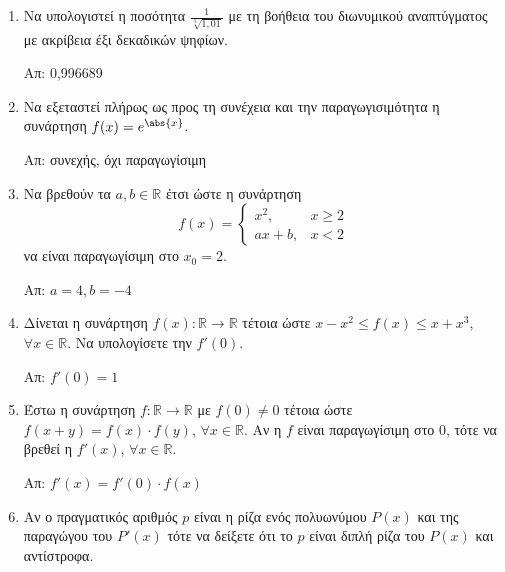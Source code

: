 






\begin{center}
\end{center}

\vspace{\baselineskip}

\begin{enumerate}

	\item Να υπολογιστεί η ποσότητα $ \frac{1}{\sqrt[3]{1,01}} $ με τη βοήθεια
		του διωνυμικού αναπτύγματος με ακρίβεια έξι δεκαδικών ψηφίων.

		\hfill Απ: 0,996689

	\item Να εξεταστεί πλήρως ως προς τη συνέχεια και την παραγωγισιμότητα η
		συνάρτηση $ f(x) = e^{\abs{x}} $.

		\hfill Απ: συνεχής, όχι παραγωγίσιμη 

	\item Να βρεθούν τα $ a, b \in \mathbb{R} $ έτσι ώστε η συνάρτηση 
		\[
			f(x) = \begin{cases}
				x^{2}, & x\geq 2 \\
				ax+b , & x<2
			\end{cases}
		\]
		να είναι παραγωγίσιμη στο $ x_{0} = 2 $.

		\hfill Απ: $ a=4, b=-4 $

	\item Δίνεται η συνάρτηση $ f(x) \colon \mathbb{R} \to \mathbb{R} $ τέτοια
		ώστε $ x - x^{2} \leq f(x) \leq x + x^{3} $, $ \forall x \in \mathbb{R}
		$. Να υπολογίσετε την $ f'(0) $.

		\hfill Απ: $ f'(0) = 1 $

	\item Έστω η συνάρτηση $ f \colon \mathbb{R} \to \mathbb{R} $ με $ f(0)
		\neq 0	$ τέτοια ώστε $ f(x+y) = f(x) \cdot f(y) $, $ \forall x \in
		\mathbb{R} $. Αν η $f$ είναι παραγωγίσιμη στο $0$, τότε να βρεθεί η $
		f'(x) $, $ \forall x \in \mathbb{R} $.

		\hfill Απ: $ f'(x) = f'(0)\cdot f(x) $

	\item Αν ο πραγματικός αριθμός $p$ είναι η ρίζα ενός πολυωνύμου $ P(x)
		$ και της παραγώγου του $ P'(x) $ τότε να δείξετε ότι το $p$ είναι διπλή
		ρίζα του $ P(x) $ και αντίστροφα.


\end{enumerate}
